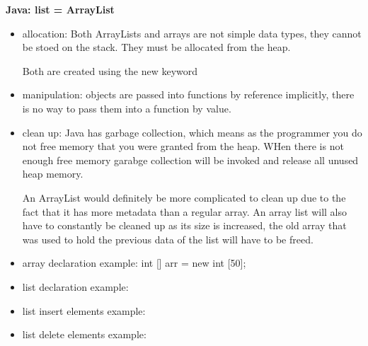 \documentclass[11pt]{article}
\begin{document}
\pagebreak
\textbf{Java: list = ArrayList}
\begin{itemize}
    \item allocation:
        Both ArrayLists and arrays are not simple data types, they cannot be
        stoed on the stack.  They must be allocated from the heap.

        Both are created using the new keyword

    \item manipulation:
        objects are passed into functions by reference implicitly, there is no
        way to pass them into a function by value.

    \item clean up:
        Java has garbage collection, which means as the programmer you do not
        free memory that you were granted from the heap.  WHen there is not
        enough free memory garabge collection will be invoked and release all
        unused heap memory.

        An ArrayList would definitely be more complicated to clean up due to
        the fact that it has more metadata than a regular array.  An array list
        will also have to constantly be cleaned up as its size is increased,
        the old array that was used to hold the previous data of the list will
        have to be freed.

    \item array declaration example:
        int [] arr = new int [50];

    \item list declaration example:

    \item list insert elements example:

    \item list delete elements example:
\end{itemize}
\end{document}
